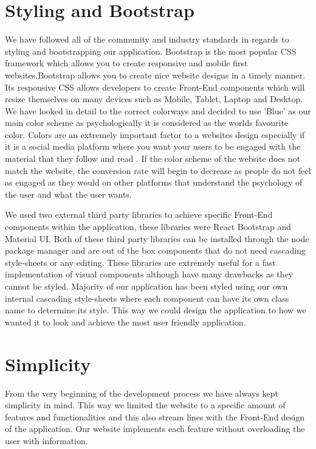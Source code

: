 \section{Styling and Bootstrap}
We have followed all of the community and industry standards in regards to styling and bootstrapping our application. Bootstrap is the most popular CSS framework which allows you to create responsive and mobile first websites.Bootstrap allows you to create nice website designs in a timely manner. Its responsive CSS allows developers to create Front-End components which will resize themselves on many devices such as Mobile, Tablet, Laptop and Desktop. We have looked in detail to the correct colorways and decided to use 'Blue' as our main color scheme as psychologically it is considered as the worlds favourite color. Colors are an extremely important factor to a websites design especially if it is a social media platform where you want your users to be engaged with the material that they follow and read \cite{singh2011impact}. If the color scheme of the website does not match the website, the conversion rate will begin to decrease as people do not feel as engaged as they would on other platforms that understand the psychology of the user and what the user wants.

We used two external third party libraries to achieve specific Front-End components within the application, these libraries were React Bootstrap and Material UI. Both of these third party libraries can be installed through the node package manager and are out of the box components that do not need cascading style-sheets or any editing. These libraries are extremely useful for a fast implementation of visual components although have many drawbacks as they cannot be styled. Majority of our application has been styled using our own internal cascading style-sheets where each component can have its own class name to determine its style. This way we could design the application to how we wanted it to look and achieve the most user friendly application.

\section{Simplicity}
From the very beginning of the development process we have always kept simplicity in mind. This way we limited the website to a specific amount of features and functionalities and this also stream lines with the Front-End design of the application. Our website implements each feature without overloading the user with information.


